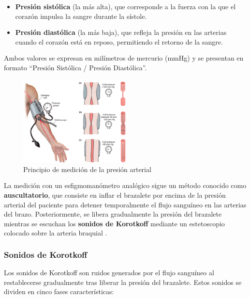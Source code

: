         \begin{itemize}
            \item \textbf{Presión sistólica} (la más alta), que corresponde a la fuerza con la que el corazón impulsa la sangre durante la sístole.
            \item \textbf{Presión diastólica} (la más baja), que refleja la presión en las arterias cuando el corazón está en reposo, permitiendo el retorno de la sangre.
        \end{itemize}

        Ambos valores se expresan en milímetros de mercurio (mmHg) y se presentan en formato “Presión Sistólica / Presión Diastólica”.

        \begin{figure}[H]
            \centering
            \includegraphics[width=0.5\textwidth]{img/Marco/medirPA.png}
            \caption[Principio de medición de la presión arterial]{Principio de medición de la presión arterial\footnotemark}
            \label{fig:medirPA}
        \end{figure}

        La medición con un esfigmomanómetro analógico sigue un método conocido como \textbf{auscultatorio}, que consiste en inflar el brazalete por encima de la presión arterial del paciente para detener temporalmente el flujo sanguíneo en las arterias del brazo. Posteriormente, se libera gradualmente la presión del brazalete mientras se escuchan los \textbf{sonidos de Korotkoff} mediante un estetoscopio colocado sobre la arteria braquial \cite{Gill_2018}.

        \subsubsection{Sonidos de Korotkoff}
        Los sonidos de Korotkoff son ruidos generados por el flujo sanguíneo al restablecerse gradualmente tras liberar la presión del brazalete. Estos sonidos se dividen en cinco fases características: 

